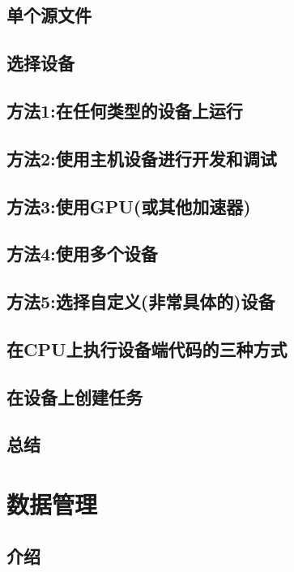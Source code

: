 \documentclass[11pt,a4paper,UTF8]{ctexart}
\begin{document}
		\subsection{单个源文件}
		
		\subsection{选择设备}
		
		\subsection{方法1:在任何类型的设备上运行}
		
		\subsection{方法2:使用主机设备进行开发和调试}
		
		\subsection{方法3:使用GPU(或其他加速器)}
		
		\subsection{方法4:使用多个设备}
		
		\subsection{方法5:选择自定义(非常具体的)设备}
		
		\subsection{在CPU上执行设备端代码的三种方式}
		
		\subsection{在设备上创建任务}
		
		\subsection{总结}
		
	\section{数据管理}
	
		\subsection{介绍}
		
\end{document}
